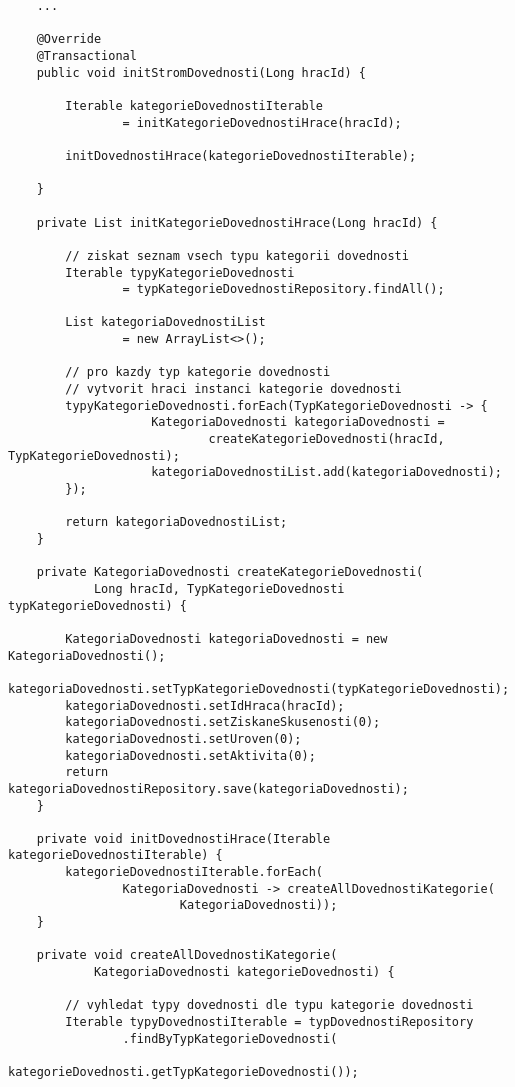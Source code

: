 \documentclass[12pt]{article}
\begin{document}
{\begin{lstlisting}
    ...
    
    @Override
    @Transactional
    public void initStromDovednosti(Long hracId) {
        
        Iterable kategorieDovednostiIterable
                = initKategorieDovednostiHrace(hracId);

        initDovednostiHrace(kategorieDovednostiIterable);

    }
    
    private List initKategorieDovednostiHrace(Long hracId) {

        // ziskat seznam vsech typu kategorii dovednosti
        Iterable typyKategorieDovednosti
                = typKategorieDovednostiRepository.findAll();
    
        List kategoriaDovednostiList
                = new ArrayList<>();
    
        // pro kazdy typ kategorie dovednosti
        // vytvorit hraci instanci kategorie dovednosti
        typyKategorieDovednosti.forEach(TypKategorieDovednosti -> {
                    KategoriaDovednosti kategoriaDovednosti =
                            createKategorieDovednosti(hracId, TypKategorieDovednosti);
                    kategoriaDovednostiList.add(kategoriaDovednosti);
        });

        return kategoriaDovednostiList;
    }
    
    private KategoriaDovednosti createKategorieDovednosti(
            Long hracId, TypKategorieDovednosti typKategorieDovednosti) {

        KategoriaDovednosti kategoriaDovednosti = new KategoriaDovednosti();
        kategoriaDovednosti.setTypKategorieDovednosti(typKategorieDovednosti);
        kategoriaDovednosti.setIdHraca(hracId);
        kategoriaDovednosti.setZiskaneSkusenosti(0);
        kategoriaDovednosti.setUroven(0);
        kategoriaDovednosti.setAktivita(0);
        return kategoriaDovednostiRepository.save(kategoriaDovednosti);
    }
    
    private void initDovednostiHrace(Iterable kategorieDovednostiIterable) {
        kategorieDovednostiIterable.forEach(
                KategoriaDovednosti -> createAllDovednostiKategorie(
                        KategoriaDovednosti));
    }

    private void createAllDovednostiKategorie(
            KategoriaDovednosti kategorieDovednosti) {

        // vyhledat typy dovednosti dle typu kategorie dovednosti
        Iterable typyDovednostiIterable = typDovednostiRepository
                .findByTypKategorieDovednosti(
                        kategorieDovednosti.getTypKategorieDovednosti());


\end{lstlisting}}
\end{document}
